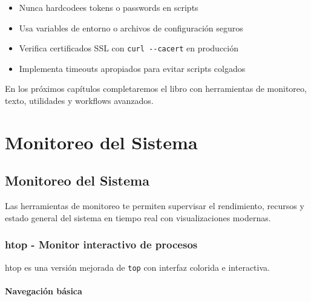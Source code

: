 \documentclass[
  11pt,
  letterpaper,
  oneside,
  openany]{scrbook}
\providecommand{\tightlist}{%
  \setlength{\itemsep}{0pt}\setlength{\parskip}{0pt}}
\begin{document}
\begin{tcolorbox}[enhanced jigsaw, coltitle=black, breakable, arc=.35mm, toprule=.15mm, colbacktitle=quarto-callout-important-color!10!white, colframe=quarto-callout-important-color-frame, opacityback=0, colback=white, bottomtitle=1mm, bottomrule=.15mm, rightrule=.15mm, left=2mm, toptitle=1mm, leftrule=.75mm, title=\textcolor{quarto-callout-important-color}{\faExclamation}\hspace{0.5em}{Seguridad en red}, titlerule=0mm, opacitybacktitle=0.6]

\begin{itemize}
\tightlist
\item
  Nunca hardcodees tokens o passwords en scripts
\item
  Usa variables de entorno o archivos de configuración seguros
\item
  Verifica certificados SSL con \texttt{curl\ -\/-cacert} en producción
\item
  Implementa timeouts apropiados para evitar scripts colgados
\end{itemize}

\end{tcolorbox}

En los próximos capítulos completaremos el libro con herramientas de
monitoreo, texto, utilidades y workflows avanzados.

\part{Monitoreo del Sistema}

\chapter{Monitoreo del Sistema}\label{monitoreo-del-sistema-2}

Las herramientas de monitoreo te permiten supervisar el rendimiento,
recursos y estado general del sistema en tiempo real con visualizaciones
modernas.

\section{htop - Monitor interactivo de procesos}\label{sec-htop}

htop es una versión mejorada de \texttt{top} con interfaz colorida e
interactiva.

\subsection{Navegación básica}\label{navegaciuxf3n-buxe1sica-1}
\end{document}
